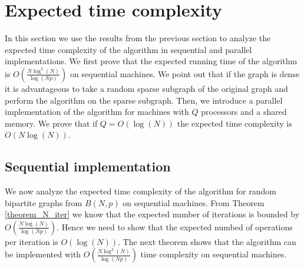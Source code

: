 \documentclass[11pt,onecolumn]{article}
\newcounter{theorem}
\begin{document}
\section{Expected time complexity}
In this section we use the results from the previous section to analyze the expected time complexity of the algorithm in sequential and parallel implementations. We first prove that the expected running time of the algorithm is $O\left(\frac{N\log^2(N)}{\log(Np)}\right)$ on sequential machines. We point out that if the graph is dense it is advantageous to take a random sparse subgraph of the original graph and perform the algorithm on the sparse subgraph. Then, we introduce a parallel implementation of the algorithm for machines with $Q$ processors and a shared memory. We prove that if $Q=O(\log(N))$ the expected time complexity is $O\left(N\log(N)\right)$.
\subsection{Sequential implementation}\label {subsection_seq}
We now analyze the expected time complexity of the algorithm for random bipartite graphs from $B(N,p)$ on sequential machines. From Theorem \ref{theorem_N_iter} we know that the expected number of iterations is bounded by $O\left(\frac{N\log(N)}{\log(Np)}\right)$. Hence we need to show that the expected numbed of operations per iteration is $O\left(\log(N)\right)$. The next theorem shows that the algorithm can be implemented with  $O\left(\frac{N\log^2(N)}{\log(Np)}\right)$ time complexity on sequential machines.
\end{document}

